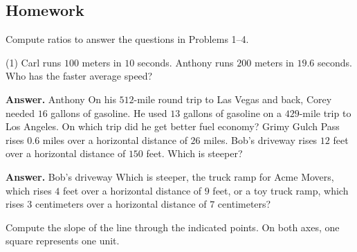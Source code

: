 \documentclass[10pt,]{book}
\theoremstyle{plain}
\theoremstyle{definition}
\theoremstyle{definition}
\theoremstyle{definition}
\theoremstyle{definition}
\numberwithin{equation}{part}
\begin{document}
\subsection[{Homework}]{Homework}\label{section-1-4-exercises}
\hypertarget{exercisegroup-25}{}\par\noindent Compute ratios to answer the questions in Problems 1–4.%
\begin{exercisegroup}(1)
\exercise[1.]\hypertarget{exercise-216}{}Carl runs \(100\) meters in \(10\) seconds. Anthony runs \(200\) meters in \(19.6\) seconds. Who has the faster average speed?%
\par\smallskip
\noindent\textbf{Answer.}\hypertarget{answer-126}{}\quad
Anthony%
\exercise[2.]\hypertarget{exercise-217}{}On his \(512\)-mile round trip to Las Vegas and back, Corey needed \(16\) gallons of gasoline. He used \(13\) gallons of gasoline on a \(429\)-mile trip to Los Angeles. On which trip did he get better fuel economy?%
\exercise[3.]\hypertarget{exercise-218}{}Grimy Gulch Pass rises \(0.6\) miles over a horizontal distance of \(26\) miles. Bob's driveway rises \(12\) feet over a horizontal distance of \(150\) feet. Which is steeper?%
\par\smallskip
\noindent\textbf{Answer.}\hypertarget{answer-127}{}\quad
Bob's driveway%
\exercise[4.]\hypertarget{exercise-219}{}Which is steeper, the truck ramp for Acme Movers, which rises \(4\) feet over a horizontal distance of \(9\) feet, or a toy truck ramp, which rises \(3\) centimeters over a horizontal distance of \(7\) centimeters?%
\end{exercisegroup}
\par\smallskip\noindent
\hypertarget{exercisegroup-26}{}\par\noindent Compute the slope of the line through the indicated points. On both axes, one square represents one unit.%
\end{document}
